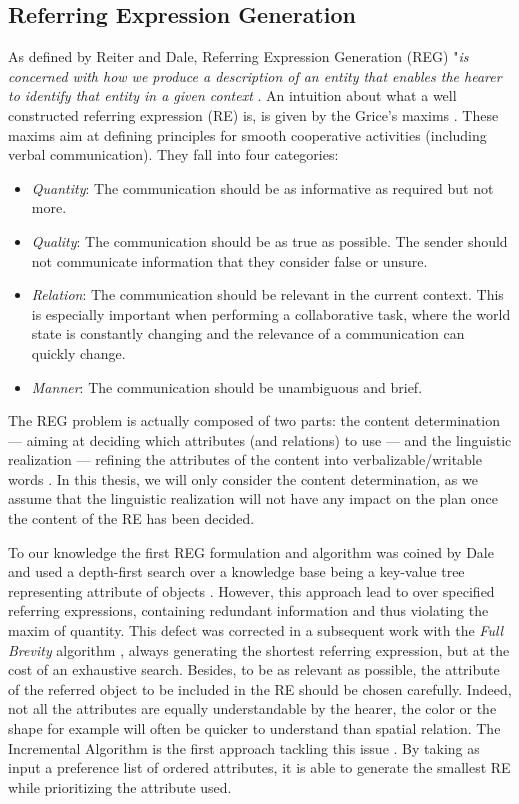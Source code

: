 \documentclass[a4paper,11pt,twoside]{StyleThese}
\begin{document}
\subsection{Referring Expression Generation}
As defined by Reiter and Dale, Referring Expression Generation (REG) "\textit{is concerned with how we produce a description of an entity that enables the hearer to identify that entity in a given context} \cite{reiter1997building}. An intuition about what a well constructed referring expression (RE) is, is given by the Grice's maxims \cite{grice1975logic}. These maxims aim at defining principles for smooth cooperative activities (including verbal communication). They fall into four categories:
\begin{itemize}
\item \textit{Quantity}: The communication should be as informative as required but not more.
\item \textit{Quality}: The communication should be as true as possible. The sender should not communicate information that they consider false or unsure.
\item \textit{Relation}: The communication should be relevant in the current context. This is especially important when performing a collaborative task, where the world state is constantly changing and the relevance of a communication can quickly change.
\item \textit{Manner}: The communication should be unambiguous and brief.
\end{itemize}

The REG problem is actually composed of two parts: the content determination --- aiming at deciding which attributes (and relations) to use --- and the linguistic realization --- refining the attributes of the content into verbalizable/writable words \cite{krahmer_computational}. In this thesis, we will only consider the content determination, as we assume that the linguistic realization will not have any impact on the plan once the content of the RE has been decided.

To our knowledge the first REG formulation and algorithm was coined by Dale and used a depth-first search over a knowledge base being a key-value tree representing attribute of objects \cite{plop}. However, this approach lead to over specified referring expressions, containing redundant information and thus violating the maxim of quantity. This defect was corrected in a subsequent work with the \textit{Full Brevity} algorithm \cite{plop}, always generating the shortest referring expression, but at the cost of an exhaustive search. Besides, to be as relevant as possible, the attribute of the referred object to be included in the RE should be chosen carefully. Indeed, not all the attributes are equally understandable by the hearer, the color or the shape for example will often be quicker to understand than spatial relation. The Incremental Algorithm is the first approach tackling this issue \cite{plop}. By taking as input a preference list of ordered attributes, it is able to generate the smallest RE while prioritizing the attribute used.
\end{document}
